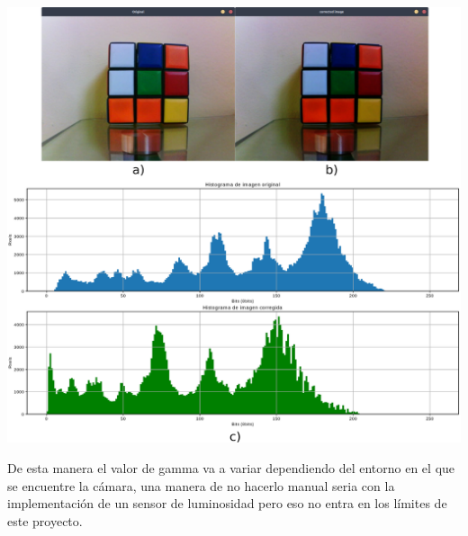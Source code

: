 \begin{center}
	\includegraphics[width=0.7 \textwidth]{Contenido/Cuerpo/Capitulo4/Fig24.eps}
	\label{Fig9}
\end{center}
De esta manera el valor de gamma va a variar dependiendo del entorno en el que se encuentre la cámara, una manera de no hacerlo
manual seria con la implementación de un sensor de luminosidad pero eso no entra en los límites de este proyecto.

